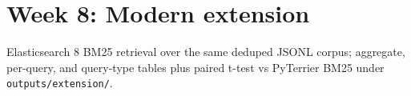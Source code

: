 \section{Week 8: Modern extension}
Elasticsearch 8 BM25 retrieval over the same deduped JSONL corpus; aggregate, per-query, and query-type tables plus paired t-test vs PyTerrier BM25 under \texttt{outputs/extension/}.
